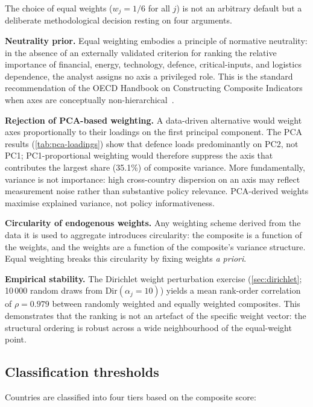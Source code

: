 The choice of equal weights ($w_j = 1/6$ for all $j$) is not an
arbitrary default but a deliberate methodological decision resting
on four arguments.

\textbf{Neutrality prior.}  Equal weighting embodies a principle of
normative neutrality: in the absence of an externally validated
criterion for ranking the relative importance of financial, energy,
technology, defence, critical-inputs, and logistics dependence, the
analyst assigns no axis a privileged role.  This is the standard
recommendation of the OECD Handbook on Constructing Composite
Indicators when axes are conceptually
non-hierarchical~\cite{oecd_handbook_2008}.

\textbf{Rejection of PCA-based weighting.}  A data-driven alternative
would weight axes proportionally to their loadings on the first
principal component.  The PCA results (\cref{tab:pca-loadings}) show
that defence loads predominantly on PC2, not PC1; PC1-proportional
weighting would therefore suppress the axis that contributes the
largest share (35.1\%) of composite variance.  More fundamentally,
variance is not importance: high cross-country dispersion on an axis
may reflect measurement noise rather than substantive policy
relevance.  PCA-derived weights maximise explained variance, not
policy informativeness.

\textbf{Circularity of endogenous weights.}  Any weighting scheme
derived from the data it is used to aggregate introduces circularity:
the composite is a function of the weights, and the weights are a
function of the composite's variance structure.  Equal weighting
breaks this circularity by fixing weights \emph{a priori}.

\textbf{Empirical stability.}  The Dirichlet weight perturbation
exercise (\cref{sec:dirichlet}; 10\,000 random draws from
$\text{Dir}(\alpha_j = 10)$) yields a mean rank-order correlation
of $\rho = 0.979$ between randomly weighted and equally weighted
composites.  This demonstrates that the ranking is not an artefact of
the specific weight vector: the structural ordering is robust across
a wide neighbourhood of the equal-weight point.

\subsection{Classification thresholds}\label{sec:classification}

Countries are classified into four tiers based on the composite score:

